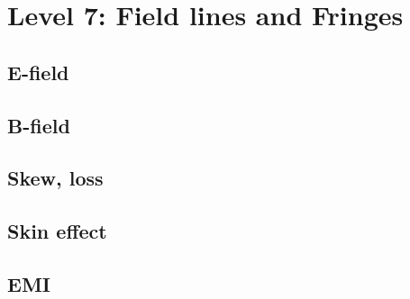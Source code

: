 
\section{Level 7: Field lines and Fringes}

\subsection{E-field}
\subsection{B-field}
\subsection{Skew, loss}
\subsection{Skin effect}
\subsection{EMI}
